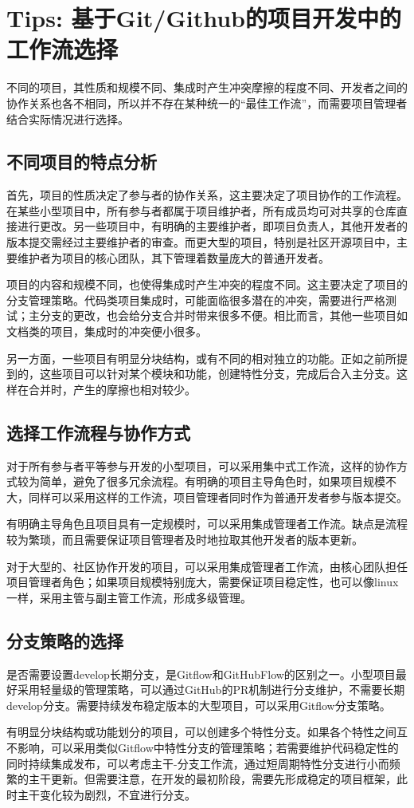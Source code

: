 \documentclass[../main.tex]{subfiles}
\begin{document}
\section{Tips: 基于Git/Github的项目开发中的工作流选择}

不同的项目，其性质和规模不同、集成时产生冲突摩擦的程度不同、开发者之间的协作关系也各不相同，所以并不存在某种统一的“最佳工作流”，而需要项目管理者结合实际情况进行选择。

\subsection{不同项目的特点分析}

首先，项目的性质决定了参与者的协作关系，这主要决定了项目协作的工作流程。在某些小型项目中，所有参与者都属于项目维护者，所有成员均可对共享的仓库直接进行更改。另一些项目中，有明确的主要维护者，即项目负责人，其他开发者的版本提交需经过主要维护者的审查。而更大型的项目，特别是社区开源项目中，主要维护者为项目的核心团队，其下管理着数量庞大的普通开发者。

项目的内容和规模不同，也使得集成时产生冲突的程度不同。这主要决定了项目的分支管理策略。代码类项目集成时，可能面临很多潜在的冲突，需要进行严格测试；主分支的更改，也会给分支合并时带来很多不便。相比而言，其他一些项目如文档类的项目，集成时的冲突便小很多。

另一方面，一些项目有明显分块结构，或有不同的相对独立的功能。正如之前所提到的，这些项目可以针对某个模块和功能，创建特性分支，完成后合入主分支。这样在合并时，产生的摩擦也相对较少。

\subsection{选择工作流程与协作方式}

对于所有参与者平等参与开发的小型项目，可以采用集中式工作流，这样的协作方式较为简单，避免了很多冗余流程。有明确的项目主导角色时，如果项目规模不大，同样可以采用这样的工作流，项目管理者同时作为普通开发者参与版本提交。

有明确主导角色且项目具有一定规模时，可以采用集成管理者工作流。缺点是流程较为繁琐，而且需要保证项目管理者及时地拉取其他开发者的版本更新。

对于大型的、社区协作开发的项目，可以采用集成管理者工作流，由核心团队担任项目管理者角色；如果项目规模特别庞大，需要保证项目稳定性，也可以像linux一样，采用主管与副主管工作流，形成多级管理。

\subsection{分支策略的选择}

是否需要设置develop长期分支，是Gitflow和GitHubFlow的区别之一。小型项目最好采用轻量级的管理策略，可以通过GitHub的PR机制进行分支维护，不需要长期develop分支。需要持续发布稳定版本的大型项目，可以采用Gitflow分支策略。

有明显分块结构或功能划分的项目，可以创建多个特性分支。如果各个特性之间互不影响，可以采用类似Gitflow中特性分支的管理策略；若需要维护代码稳定性的同时持续集成发布，可以考虑主干-分支工作流，通过短周期特性分支进行小而频繁的主干更新。但需要注意，在开发的最初阶段，需要先形成稳定的项目框架，此时主干变化较为剧烈，不宜进行分支。
\end{document}
